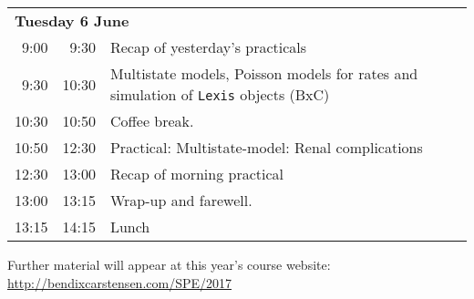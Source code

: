 \noindent
\begin{tabular}{r@{ -- }rp{13cm}}
\multicolumn{3}{l}{\bf Tuesday 6 June} \\
 9:00 &  9:30 & Recap of yesterday's practicals \\
 9:30 & 10:30 & Multistate models, Poisson models for rates and
                simulation of \texttt{Lexis} objects (BxC)\\
10:30 & 10:50 & Coffee break. \\
10:50 & 12:30 & Practical: Multistate-model: Renal complications\\
12:30 & 13:00 & Recap of morning practical \\
13:00 & 13:15 & Wrap-up and farewell.\\
13:15 & 14:15 & Lunch \\
\end{tabular}
\vfill
\noindent
Further material will appear at this year's course website:\\ 
\url{http://bendixcarstensen.com/SPE/2017}